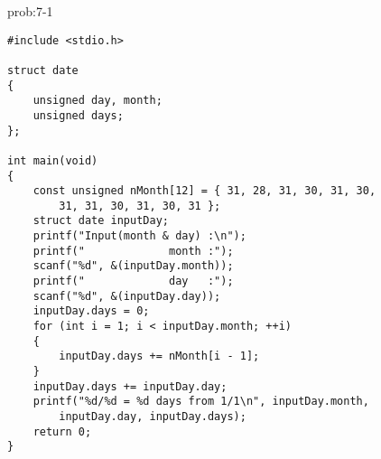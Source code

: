 \begin{renshuu-answer}{prob:7-1}
\baselineskip=12pt
\begin{verbatim}
#include <stdio.h>

struct date
{
    unsigned day, month;
    unsigned days;
};

int main(void)
{
    const unsigned nMonth[12] = { 31, 28, 31, 30, 31, 30,
        31, 31, 30, 31, 30, 31 };
    struct date inputDay;
    printf("Input(month & day) :\n");
    printf("             month :");
    scanf("%d", &(inputDay.month));
    printf("             day   :");
    scanf("%d", &(inputDay.day));
    inputDay.days = 0;
    for (int i = 1; i < inputDay.month; ++i)
    {
        inputDay.days += nMonth[i - 1];
    }
    inputDay.days += inputDay.day;
    printf("%d/%d = %d days from 1/1\n", inputDay.month,
        inputDay.day, inputDay.days);
    return 0;
}
\end{verbatim}
\end{renshuu-answer}
